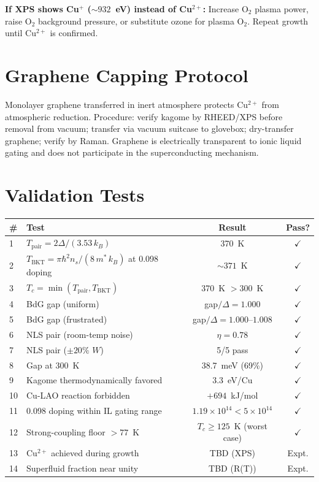 \documentclass[11pt, a4paper]{article}
\begin{document}
\textbf{If XPS shows Cu$^+$ ($\sim 932$~eV) instead of
Cu$^{2+}$:} Increase O$_2$ plasma power, raise O$_2$
background pressure, or substitute ozone for plasma O$_2$.
Repeat growth until Cu$^{2+}$ is confirmed.

\section{Graphene Capping Protocol}
\label{sec:graphene}

Monolayer graphene transferred in inert atmosphere protects
Cu$^{2+}$ from atmospheric reduction. Procedure: verify kagome
by RHEED/XPS before removal from vacuum; transfer via vacuum
suitcase to glovebox; dry-transfer graphene; verify by Raman.
Graphene is electrically transparent to ionic liquid gating and
does not participate in the superconducting mechanism.

\section{Validation Tests}

\begin{center}
\begin{tabular}{@{}llcc@{}}
\toprule
\textbf{\#} & \textbf{Test} & \textbf{Result} & \textbf{Pass?} \\
\midrule
1 & $T_{\text{pair}} = 2\Delta/(3.53\,k_B)$ & 370~K &
  $\checkmark$ \\
2 & $T_{\text{BKT}} = \pi\hbar^2 n_s/(8\,m^*\,k_B)$
  at 0.098 doping & $\sim 371$~K & $\checkmark$ \\
3 & $T_c = \min(T_{\text{pair}}, T_{\text{BKT}})$ &
  370~K $> 300$~K & $\checkmark$ \\
4 & BdG gap (uniform) & gap$/\Delta = 1.000$ & $\checkmark$ \\
5 & BdG gap (frustrated) & gap$/\Delta = 1.000$--$1.008$ &
  $\checkmark$ \\
6 & NLS pair (room-temp noise) & $\eta = 0.78$ & $\checkmark$ \\
7 & NLS pair ($\pm 20\%$ $W$) & 5/5 pass & $\checkmark$ \\
8 & Gap at 300~K & 38.7~meV (69\%) & $\checkmark$ \\
9 & Kagome thermodynamically favored & 3.3~eV/Cu & $\checkmark$ \\
10 & Cu-LAO reaction forbidden & $+694$~kJ/mol & $\checkmark$ \\
11 & 0.098 doping within IL gating range &
  $1.19 \times 10^{14} < 5 \times 10^{14}$ & $\checkmark$ \\
12 & Strong-coupling floor $> 77$~K &
  $T_c \geq 125$~K (worst case) & $\checkmark$ \\
\midrule
13 & Cu$^{2+}$ achieved during growth &
  \textcolor{nm-orange}{TBD (XPS)} &
  \textcolor{nm-orange}{Expt.} \\
14 & Superfluid fraction near unity &
  \textcolor{nm-orange}{TBD (R(T))} &
  \textcolor{nm-orange}{Expt.} \\
\bottomrule
\end{tabular}
\end{center}
\end{document}
